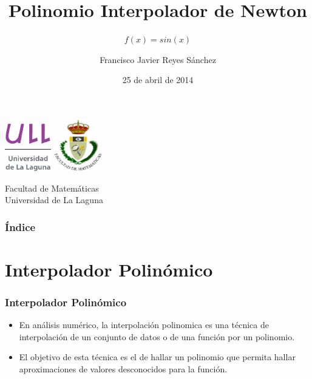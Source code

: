\documentclass{beamer}
\title[Presentación con Beamer]{Polinomio Interpolador de Newton}
\subtitle[Presentación con Beamer]{$f(x)=sin(x)$}
\author[Técnicas Experimentales]{Francisco Javier Reyes Sánchez}
\date[25-03-2014]{25 de abril de 2014}
\begin{document}
  
\begin{frame}

  \includegraphics[width=0.15\textwidth]{img/ullesc}
  \hspace*{7.0cm}
  \includegraphics[width=0.16\textwidth]{img/fmatesc}
  \titlepage

  \begin{small}
    \begin{center}
     Facultad de Matemáticas \\
     Universidad de La Laguna
    \end{center}
  \end{small}

\end{frame}

\begin{frame}
  \frametitle{Índice}  
  \tableofcontents[pausesections]
\end{frame}


\section{Interpolador Polinómico}


\begin{frame}

\frametitle{Interpolador Polinómico}

 \begin{itemize}
 \item
    En análisis numérico, la interpolación polinomica es una técnica de interpolación de un conjunto de datos o de una función por un polinomio. 
 \item
    El objetivo de esta técnica es el de hallar un polinomio que permita hallar aproximaciones de valores desconocidos para la función.
  \end{itemize}

\end{frame}
\end{document}
